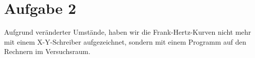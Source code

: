 \section{Aufgabe 2}

Aufgrund veränderter Umstände, haben wir die Frank-Hertz-Kurven nicht mehr mit einem X-Y-Schreiber aufgezeichnet, sondern mit einem Programm auf den Rechnern im Versuchsraum.